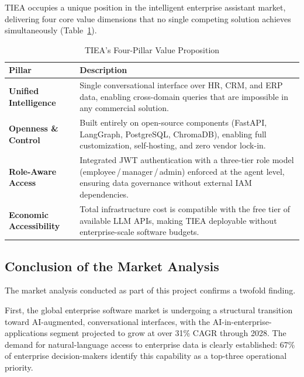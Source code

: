 \documentclass[12pt,a4paper]{report}
\begin{document}
TIEA occupies a unique position in the intelligent enterprise assistant market, delivering four
core value dimensions that no single competing solution achieves simultaneously
(Table~\ref{tab:value-prop}).

\begin{table}[H]
\centering
\caption{TIEA's Four-Pillar Value Proposition}
\label{tab:value-prop}
\renewcommand{\arraystretch}{1.6}
\begin{tabularx}{\linewidth}{>{\bfseries\color{talannavy}}l X}
\toprule
\rowcolor{talannavy}
\color{white}\textbf{Pillar} & \color{white}\textbf{Description} \\
\midrule
\rowcolor{talangray}
Unified Intelligence &
Single conversational interface over HR, CRM, and ERP data, enabling cross-domain
queries that are impossible in any commercial solution. \\
Openness \& Control &
Built entirely on open-source components (FastAPI, LangGraph, PostgreSQL,
ChromaDB), enabling full customization, self-hosting, and zero vendor lock-in. \\
\rowcolor{talangray}
Role-Aware Access &
Integrated JWT authentication with a three-tier role model
(employee\,/\,manager\,/\,admin) enforced at the agent level,
ensuring data governance without external IAM dependencies. \\
Economic Accessibility &
Total infrastructure cost is compatible with the free tier of available LLM
APIs, making TIEA deployable without enterprise-scale software budgets. \\
\bottomrule
\end{tabularx}
\end{table}

\subsection{Conclusion of the Market Analysis}

The market analysis conducted as part of this project confirms a twofold finding.

First, the global enterprise software market is undergoing a structural transition toward
AI-augmented, conversational interfaces, with the AI-in-enterprise-applications segment projected
to grow at over 31\% CAGR through 2028.
The demand for natural-language access to enterprise data is clearly established: 67\% of enterprise
decision-makers identify this capability as a top-three operational priority.
\end{document}
